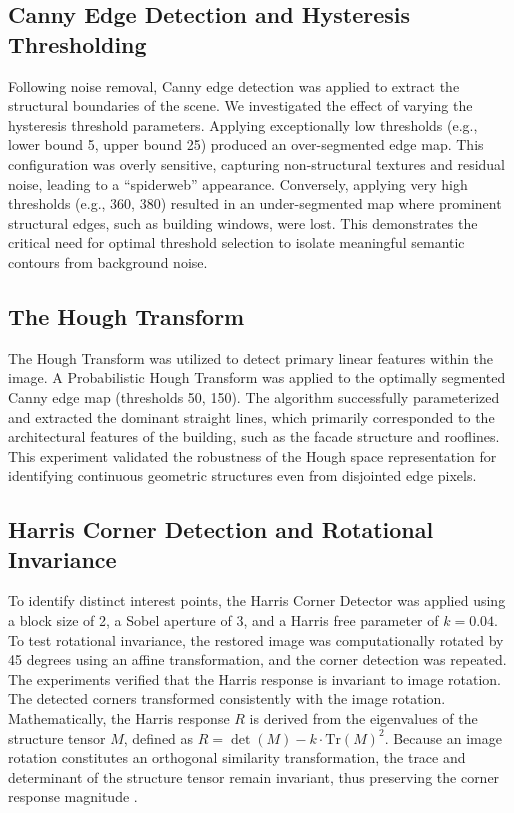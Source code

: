 \documentclass[11pt,a4paper]{article}
\begin{document}
\subsection{Canny Edge Detection and Hysteresis Thresholding}
Following noise removal, Canny edge detection \cite{canny1986} was applied to extract the structural boundaries of the scene. We investigated the effect of varying the hysteresis threshold parameters. 
Applying exceptionally low thresholds (e.g., lower bound 5, upper bound 25) produced an over-segmented edge map. This configuration was overly sensitive, capturing non-structural textures and residual noise, leading to a ``spiderweb'' appearance. Conversely, applying very high thresholds (e.g., 360, 380) resulted in an under-segmented map where prominent structural edges, such as building windows, were lost. This demonstrates the critical need for optimal threshold selection to isolate meaningful semantic contours from background noise.

\subsection{The Hough Transform}
The Hough Transform \cite{duda1972} was utilized to detect primary linear features within the image. A Probabilistic Hough Transform was applied to the optimally segmented Canny edge map (thresholds 50, 150). The algorithm successfully parameterized and extracted the dominant straight lines, which primarily corresponded to the architectural features of the building, such as the facade structure and rooflines. This experiment validated the robustness of the Hough space representation for identifying continuous geometric structures even from disjointed edge pixels.

\subsection{Harris Corner Detection and Rotational Invariance}
To identify distinct interest points, the Harris Corner Detector \cite{harris1988} was applied using a block size of 2, a Sobel aperture of 3, and a Harris free parameter of $k = 0.04$. To test rotational invariance, the restored image was computationally rotated by 45 degrees using an affine transformation, and the corner detection was repeated. 
The experiments verified that the Harris response is invariant to image rotation. The detected corners transformed consistently with the image rotation. Mathematically, the Harris response $R$ is derived from the eigenvalues of the structure tensor $M$, defined as $R = \det(M) - k \cdot \text{Tr}(M)^2$. Because an image rotation constitutes an orthogonal similarity transformation, the trace and determinant of the structure tensor remain invariant, thus preserving the corner response magnitude \cite{szeliski2010}.
\end{document}
